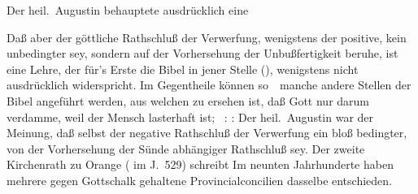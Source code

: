 \begin{aufza}
\begin{aufzb}
\item Der heil.\ Augustin behauptete ausdrücklich eine 
\end{aufzb}
\item Daß aber der göttliche Rathschluß der Verwerfung, wenigstens der positive, kein unbedingter sey, sondern auf der Vorhersehung der Unbußfertigkeit beruhe, ist eine Lehre, der für's Erste die Bibel in jener Stelle (), wenigstens nicht ausdrücklich widerspricht. Im Gegentheile können so~\ manche andere Stellen der Bibel angeführt werden, aus welchen zu ersehen ist, daß Gott nur darum verdamme, weil der Mensch lasterhaft ist; \zB\ :  :  Der heil.\ Augustin war der Meinung, daß selbst der negative Rathschluß der Verwerfung ein bloß bedingter, von der Vorhersehung der Sünde abhängiger Rathschluß sey. Der zweite Kirchenrath zu Orange ( im J.\ 529) schreibt  Im neunten Jahrhunderte haben mehrere gegen Gottschalk gehaltene Provincialconcilien dasselbe entschieden.
\end{aufza}

